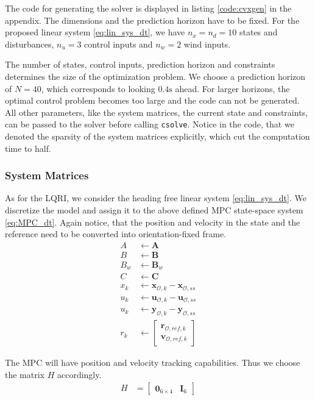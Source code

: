 The code for generating the solver is displayed in listing \ref{code:cvxgen} in the appendix. The dimensions and the prediction horizon have to be fixed. For the proposed linear system \ref{eq:lin_sys_dt}, we have $n_x=n_d=10$ states and disturbances, $n_u=3$ control inputs and $n_w=2$ wind inputs. 

The number of states, control inputs, prediction horizon and constraints determines the size of the optimization problem. We choose a prediction horizon of $N=40$, which corresponds to looking $0.4\si{\second}$ ahead. For larger horizons, the optimal control problem becomes too large and the code can not be generated. All other parameters, like the system matrices, the current state and constraints, can be passed to the solver before calling \texttt{csolve}. Notice in the code, that we denoted the sparsity of the system matrices explicitly, which cut the computation time to half.

\subsubsection{System Matrices}
As for the LQRI, we consider the heading free linear system \ref{eq:lin_sys_dt}. We discretize the model  and assign it to the above defined MPC state-space system \ref{eq:MPC_dt}. Again notice, that the position and velocity in the state and the reference need to be converted into orientation-fixed frame. 
\begin{align}
A &\gets {\mathbf{A}} \\
B &\gets {\mathbf{B}} \\
B_w &\gets {\mathbf{B}}_w \\
C &\gets {\mathbf{C}} \\
x_k &\gets \mathbf{x}_{\mathcal{O},k} - \mathbf{x}_{\mathcal{O},ss}  \\
u_k &\gets \mathbf{u}_{\mathcal{O},k} - \mathbf{u}_{\mathcal{O},ss}  \\
u_k &\gets \mathbf{y}_{\mathcal{O},k} - \mathbf{y}_{\mathcal{O},ss}  \\
r_k &\gets \begin{bmatrix}
\mathbf{r}_{\mathcal{O},ref,k} \\
\mathbf{v}_{\mathcal{O},ref,k}
\end{bmatrix}
\end{align}

The MPC will have position and velocity tracking capabilities. Thus we choose the matrix $H$ accordingly.
\begin{align}
H &= \begin{bmatrix}
\mathbf{0}_{6\times4} & \mathbf{I}_6 
\end{bmatrix} 
\end{align}
